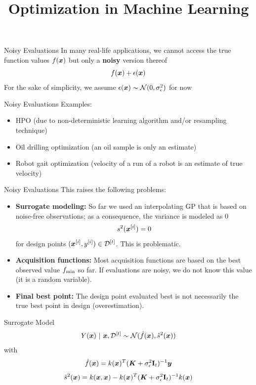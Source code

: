 \documentclass[11pt,compress,t,notes=noshow, xcolor=table]{beamer}
\title{Optimization in Machine Learning}
\begin{document}

\begin{framev}{Noisy Evaluations}
In many real-life applications, we cannot access the true function values $f(\bm{x})$ but only a \textbf{noisy} version thereof
$$f(\bm{x}) + \epsilon(\bm{x})$$
For the sake of simplicity, we assume $\epsilon(\bm{x}) \sim \mathcal{N}(0, \sigma_{\epsilon}^2)$ for now\\
\vfill
{}
\end{framev}


\begin{framev}{Noisy Evaluations}
Examples:
\begin{itemize}
\item HPO (due to non-deterministic learning algorithm and/or resampling technique)
\item Oil drilling optimization (an oil sample is only an estimate)
\item Robot gait optimization (velocity of a run of a robot is an estimate of true velocity)
\end{itemize}
\end{framev}

\begin{framev}{Noisy Evaluations}
This raises the following problems:
\begin{itemize}
\item \textbf{Surrogate modeling:} So far we used an interpolating GP that is based on noise-free observations; as a consequence, the variance is modeled as $0$
$$
s^2(\bm{x}^{[i]}) = 0
$$
for design points $(\bm{x}^{[i]}, y^{[i]}) \in \mathcal{D}^{[t]}$. This is problematic.
\item \textbf{Acquisition functions:} Most acquisition functions are based on the best observed value $f_{\min}$ so far. If evaluations are noisy, we do not know this value (it is a random variable).
\item \textbf{Final best point:} The design point evaluated best is not necessarily the true best point in design (overestimation).
\end{itemize}
\end{framev}


\begin{framev}{Surrogate Model}
\vfill
$$
Y(\bm{x}) ~|~ \bm{x}, \mathcal{D}^{[t]} \sim \mathcal{N}(\hat{f}(\bm{x}), \hat{s}^2(\bm{x}))
$$
with
$$
\hat{f}(\bm{x}) = k(\bm{x})^T (\bm{K} + \sigma_{\epsilon}^2\mathbf{I}_t)^{-1} \bm{y}
$$
$$
\hat{s}^2(\bm{x}) = k(\bm{x}, \bm{x}) - k(\bm{x})^T (\bm{K} + \sigma_{\epsilon}^2\mathbf{I}_t)^{-1} k(\bm{x})
$$
\end{framev}
\end{document}
